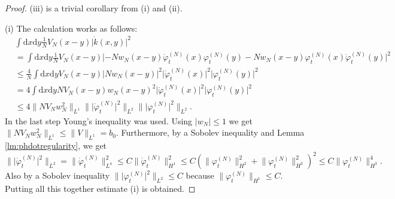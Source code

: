 \documentclass[11pt,a4paper,DIV11]{scrartcl}	%
\newcommand{\di}{\textrm{d}}		%
\newcommand{\norm}[1]{\lVert#1\rVert}	%
\newcommand{\ph}{\varphi_t^{(N)}}	%
\newcommand{\phdot}{\dot{\varphi}_t^{(N)}}	%
\newcommand{\bd}{\begin{displaymath}}			%
\newcommand{\ed}{\end{displaymath}}
\begin{document}
\begin{proof} (iii) is a trivial corollary from (i) and (ii).

(i) The calculation works as follows:
\begin{align*}
& \int \di x\di y \frac{1}{N}V_N(x-y) \lvert \dot k(x,y)\rvert^2 \\
& = \int \di x\di y \frac{1}{N} V_N(x-y) \lvert -N w_N(x-y) \phdot(x) \ph(y) - N w_N(x-y) \ph(x) \phdot(y)\rvert^2 \\
& \leq \frac{4}{N} \int \di x\di y V_N(x-y) \lvert N w_N(x-y) \rvert^2 \lvert \phdot(x)\rvert^2 \lvert \ph(y)\rvert^2 \\
& = 4 \int \di x \di y NV_N(x-y) w_N(x-y)^2 \lvert \phdot(x)\rvert^2 \lvert \ph(y)\rvert^2 \\
& \leq 4 \norm{N V_N w_N^2}_{L^1} \norm{\lvert\phdot\rvert^2}_{L^2} \norm{\lvert \ph\rvert^2}_{L^2}.
\end{align*}
In the last step Young's inequality was used. Using $\lvert w_N\rvert \leq 1$ we get $\norm{N V_N w_N^2}_{L^1} \leq \norm{V}_{L^1} = b_0$.
Furthermore, by a Sobolev inequality and Lemma \ref{lm:phdotregularity}, we get
\bd
\norm{\lvert \phdot\rvert^2}_{L^2} = \norm{\phdot}_{L^4}^2 \leq C \norm{\phdot}_{H^1}^2 \leq C(\norm{\ph}_{H^2}^2 + \norm{\ph}_{H^3}^2)^2 \leq C \norm{\ph}_{H^3}^4.
\ed
Also by a Sobolev inequality $\norm{\lvert \ph\rvert^2}_{L^2} \leq C$ because $\norm{\ph}_{H^1} \leq C$. Putting all this together estimate (i) is obtained.


\end{proof}
\end{document}
